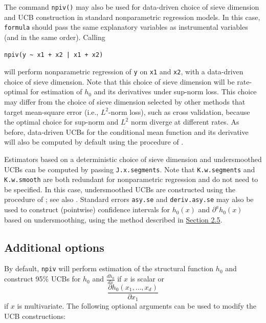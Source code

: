 \documentclass[
]{jss}
\begin{document}
The command \texttt{npiv()} may also be used for data-driven choice of
sieve dimension and UCB construction in standard nonparametric
regression models. In this case, \texttt{formula} should pass the same
explanatory variables as instrumental variables (and in the same order).
Calling

\begin{verbatim}
npiv(y ~ x1 + x2 | x1 + x2)
\end{verbatim}

will perform nonparametric regression of \texttt{y} on \texttt{x1} and
\texttt{x2}, with a data-driven choice of sieve dimension. Note that
this choice of sieve dimension will be rate-optimal for estimation of
\(h_0\) and its derivatives under sup-norm loss. This choice may differ
from the choice of sieve dimension selected by other methods that target
mean-square error (i.e., \(L^2\)-norm loss), such as cross validation,
because the optimal choice for sup-norm and \(L^2\) norm diverge at
different rates. As before, data-driven UCBs for the conditional mean
function and its derivative will also be computed by default using the
procedure of \citet{CCK}.

Estimators based on a deterministic choice of sieve dimension and
undersmoothed UCBs can be computed by passing \texttt{J.x.segments}.
Note that \texttt{K.w.segments} and \texttt{K.w.smooth} are both
redundant for nonparametric regression and do not need to be specified.
In this case, undersmoothed UCBs are constructed using the procedure of
\citet{CCQE}; see also \citet{BCCK}. Standard errors \texttt{asy.se} and
\texttt{deriv.asy.se} may also be used to construct (pointwise)
confidence intervals for \(h_0(x)\) and \(\partial^a h_0(x)\) based on
undersmoothing, using the method described in
\protect\hyperlink{pw}{Section 2.5}.

\newpage

\hypertarget{additional-options}{%
\subsection{Additional options}\label{additional-options}}

By default, \texttt{npiv} will perform estimation of the structural
function \(h_0\) and construct 95\% UCBs for \(h_0\) and
\(\frac{d h_0}{dx}\) if \(x\) is scalar or \[
 \frac{\partial h_0(x_1,\ldots,x_d)}{\partial x_1}
\] if \(x\) is multivariate. The following optional arguments can be
used to modify the UCB constructions:
\end{document}
